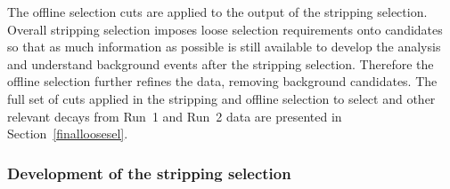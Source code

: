 
The offline selection cuts are applied to the output of the stripping selection. Overall stripping selection imposes loose selection requirements onto \bmumu candidates so that as much information as possible is still available to develop the analysis and understand background events after the stripping selection. Therefore the offline selection further refines the data, removing background candidates. The full set of cuts applied in the stripping and offline selection to select \bmumu and other relevant decays from Run~1 and Run~2 data are presented in Section~\ref{finalloosesel}. 


 



\subsubsection{Development of the stripping selection}
\label{strippingold}

